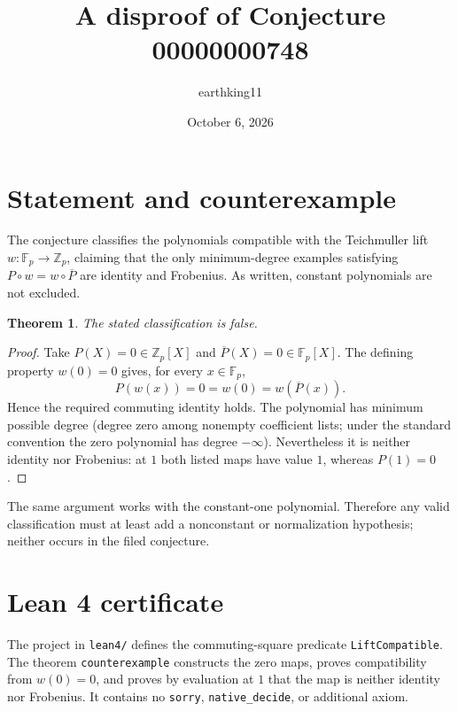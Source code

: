 \documentclass[11pt]{article}
\title{A disproof of Conjecture 00000000748}
\author{earthking11}
\date{October 6, 2026}
\newtheorem{theorem}{Theorem}
\begin{document}
\maketitle
\section*{Statement and counterexample}
The conjecture classifies the polynomials compatible with the Teichmuller lift
$w:\mathbb F_p\to\mathbb Z_p$, claiming that the only minimum-degree examples
satisfying $P\circ w=w\circ\overline P$ are identity and Frobenius.  As written,
constant polynomials are not excluded.

\begin{theorem}
The stated classification is false.
\end{theorem}
\begin{proof}
Take $P(X)=0\in\mathbb Z_p[X]$ and $\overline P(X)=0\in\mathbb F_p[X]$.
The defining property $w(0)=0$ gives, for every $x\in\mathbb F_p$,
\[
 P(w(x))=0=w(0)=w(\overline P(x)).
\]
Hence the required commuting identity holds.  The polynomial has minimum
possible degree (degree zero among nonempty coefficient lists; under the
standard convention the zero polynomial has degree $-\infty$).  Nevertheless
it is neither identity nor Frobenius: at $1$ both listed maps have value $1$,
whereas $P(1)=0$.
\end{proof}

The same argument works with the constant-one polynomial.  Therefore any valid
classification must at least add a nonconstant or normalization hypothesis;
neither occurs in the filed conjecture.

\section*{Lean 4 certificate}
The project in \texttt{lean4/} defines the commuting-square predicate
\texttt{LiftCompatible}.  The theorem \texttt{counterexample} constructs the
zero maps, proves compatibility from $w(0)=0$, and proves by evaluation at $1$
that the map is neither identity nor Frobenius.  It contains no
\texttt{sorry}, \texttt{native\_decide}, or additional axiom.
\end{document}
